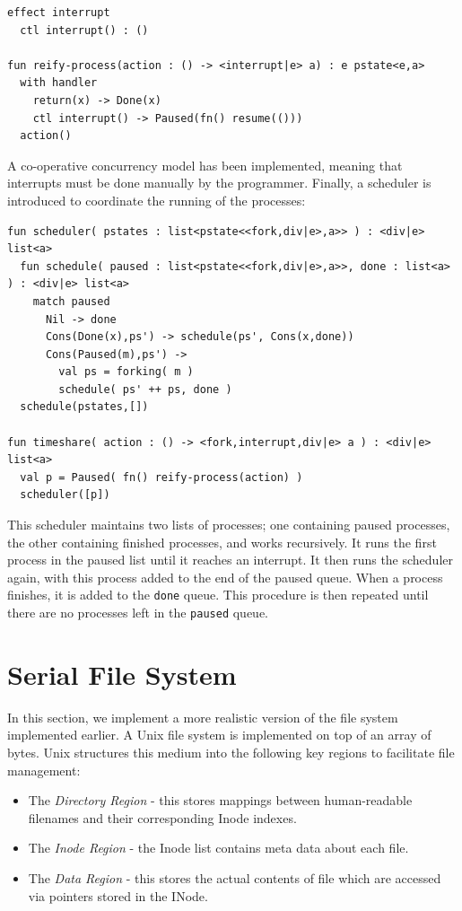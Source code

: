 \documentclass[logo,bsc,singlespacing,parskip]{infthesis}
\begin{document}
\begin{lstlisting}
effect interrupt
  ctl interrupt() : ()

fun reify-process(action : () -> <interrupt|e> a) : e pstate<e,a> 
  with handler  
    return(x) -> Done(x)
    ctl interrupt() -> Paused(fn() resume(()))
  action()
\end{lstlisting}
A co-operative concurrency model has been implemented, meaning that interrupts must be done manually by the programmer. Finally, a scheduler is introduced to coordinate the running of the processes: 
\begin{lstlisting}
fun scheduler( pstates : list<pstate<<fork,div|e>,a>> ) : <div|e> list<a>
  fun schedule( paused : list<pstate<<fork,div|e>,a>>, done : list<a> ) : <div|e> list<a>
    match paused
      Nil -> done
      Cons(Done(x),ps') -> schedule(ps', Cons(x,done))
      Cons(Paused(m),ps') ->
        val ps = forking( m )
        schedule( ps' ++ ps, done )
  schedule(pstates,[])

fun timeshare( action : () -> <fork,interrupt,div|e> a ) : <div|e> list<a>
  val p = Paused( fn() reify-process(action) )
  scheduler([p])
\end{lstlisting}
This scheduler maintains two lists of processes; one containing paused processes, the other containing finished processes, and works recursively. It runs the first process in the paused list until it reaches an interrupt. It then runs the scheduler again, with this process added to the end of the paused queue. When a process finishes, it is added to the \lstinline{done} queue. This procedure is then repeated until there are no processes left in the \lstinline{paused} queue.

\section{Serial File System}
In this section, we implement a more realistic version of the file system implemented earlier. A Unix file system is implemented on top of an array of bytes. Unix structures this medium into the following key regions to facilitate file management:
\begin{itemize}
    \item The \textit{Directory Region} - this stores mappings between human-readable filenames and their corresponding Inode indexes.
    \item The \textit{Inode Region} - the Inode list contains meta data about each file.
    \item The \textit{Data Region} - this stores the actual contents of file which are accessed via pointers stored in the INode.
\end{itemize}
\end{document}
